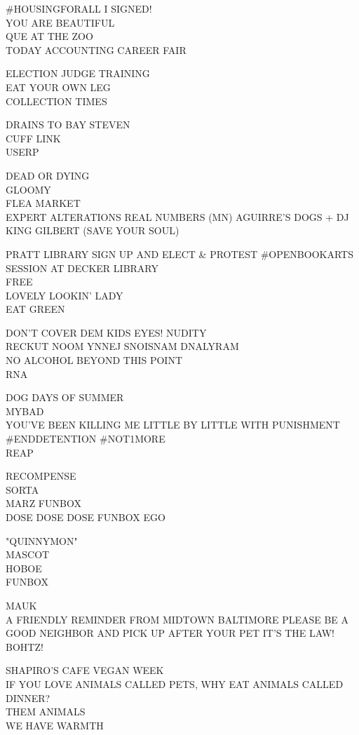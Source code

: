 \documentclass[10pt,letterpaper]{article}
\begin{document}
\#HOUSINGFORALL I SIGNED!\\
YOU ARE BEAUTIFUL\\
QUE AT THE ZOO\\
TODAY ACCOUNTING CAREER FAIR

ELECTION JUDGE TRAINING\\
EAT YOUR OWN LEG\\
COLLECTION TIMES

DRAINS TO BAY STEVEN\\
CUFF LINK\\
USERP

DEAD OR DYING\\
GLOOMY\\
FLEA MARKET\\
EXPERT ALTERATIONS REAL NUMBERS (MN) AGUIRRE'S DOGS + DJ KING GILBERT (SAVE YOUR SOUL)

PRATT LIBRARY SIGN UP AND ELECT \& PROTEST \#OPENBOOKARTS SESSION AT DECKER LIBRARY\\
FREE\\
LOVELY LOOKIN' LADY\\
EAT GREEN

DON'T COVER DEM KIDS EYES!  NUDITY\\
RECKUT NOOM YNNEJ SNOISNAM DNALYRAM\\
NO ALCOHOL BEYOND THIS POINT\\
RNA

DOG DAYS OF SUMMER\\
MYBAD\\
YOU'VE BEEN KILLING ME LITTLE BY LITTLE WITH PUNISHMENT \#ENDDETENTION \#NOT1MORE\\
REAP

RECOMPENSE\\
SORTA\\
MARZ FUNBOX\\
DOSE DOSE DOSE FUNBOX EGO

"QUINNYMON"\\
MASCOT\\
HOBOE\\
FUNBOX

MAUK\\
A FRIENDLY REMINDER FROM MIDTOWN BALTIMORE PLEASE BE A GOOD NEIGHBOR AND PICK UP AFTER YOUR PET IT'S THE LAW!\\
BOHTZ!

SHAPIRO'S CAFE VEGAN WEEK\\
IF YOU LOVE ANIMALS CALLED PETS, WHY EAT ANIMALS CALLED DINNER?\\
THEM ANIMALS\\
WE HAVE WARMTH
\end{document}
